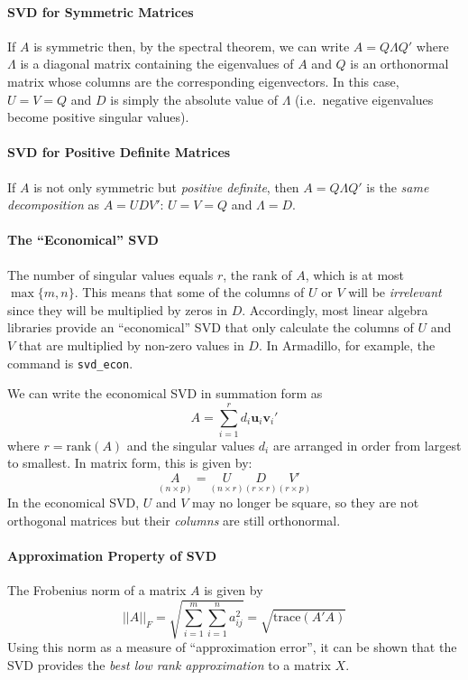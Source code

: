 \documentclass[12pt]{article}
\theoremstyle{definition}
\begin{document}
\paragraph{SVD for Symmetric Matrices} If $A$ is symmetric then, by the spectral theorem, we can write $A = Q\Lambda Q'$ where $\Lambda$ is a diagonal matrix containing the eigenvalues of $A$ and $Q$ is an orthonormal matrix whose columns are the corresponding eigenvectors. In this case, $U = V = Q$ and $D$ is simply the absolute value of $\Lambda$ (i.e.\ negative eigenvalues become positive singular values).

\paragraph{SVD for Positive Definite Matrices} If $A$ is not only symmetric but \emph{positive definite}, then $A = Q\Lambda Q'$ is the \emph{same decomposition} as $A = UDV'$: $U=V=Q$ and $\Lambda = D$.

\paragraph{The ``Economical'' SVD}
The number of singular values equals $r$, the rank of $A$, which is at most $\max\{m,n\}$. This means that some of the columns of $U$ or $V$ will be \emph{irrelevant} since they will be multiplied by zeros in $D$. Accordingly, most linear algebra libraries provide an ``economical'' SVD that only calculate the columns of $U$ and $V$ that are multiplied by non-zero values in $D$. In Armadillo, for example, the command is \texttt{svd\_econ}. 

We can write the economical SVD in summation form as 
	$$A = \sum_{i=1}^r d_i \textbf{u}_i \textbf{v}_i'$$
where $r = \mbox{rank}(A)$ and the singular values $d_i$ are arranged in order from largest to smallest. In matrix form, this is given by:
	$$\underset{(n\times p)}{A} = \underset{(n\times r)}{U} \underset{(r\times r)}{D} \underset{(r\times p)}{V'}$$
In the economical SVD, $U$ and $V$ may no longer be square, so they are not orthogonal matrices but their \emph{columns} are still orthonormal.

\paragraph{Approximation Property of SVD} The Frobenius norm of a matrix $A$ is given by
	$$||A||_F = \sqrt{\sum_{i=1}^m \sum_{i=1}^n a_{ij}^2} = \sqrt{\mbox{trace}(A'A)}$$
Using this norm as a measure of ``approximation error'', it can be shown that the SVD provides the \emph{best low rank approximation} to a matrix $X$. 
\end{document}
